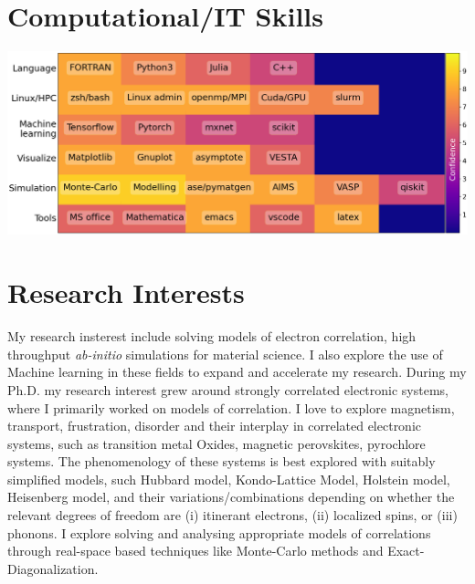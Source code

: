 \documentclass[10pt,a4paper,sans]{moderncv}        %
\begin{document}
\vspace{0.5cm}
\section{Computational/IT Skills}
\includegraphics[width=\textwidth]{skills.png}

\vspace{0.9cm}

\section{Research Interests}
My research insterest include solving models of electron correlation, high throughput \textit{ab-initio} simulations
for material science. I also explore the use of Machine learning in these fields to expand and accelerate my research.
\vspace{0.5cm}
{
  During my Ph.D. my research interest grew around strongly correlated electronic
  systems, where I primarily worked on models of correlation. I love to explore magnetism,
  transport, frustration, disorder and their interplay in correlated electronic systems,
  such as transition metal Oxides, magnetic perovskites, pyrochlore systems.
  The phenomenology of these systems is best explored with suitably simplified models,
  such Hubbard model, Kondo-Lattice Model, Holstein model, Heisenberg model, and their
  variations/combinations depending on whether the relevant degrees of freedom are
  (i) itinerant electrons, (ii) localized spins, or (iii) phonons.
  I explore solving and analysing appropriate models of correlations through real-space
  based techniques like Monte-Carlo methods and Exact-Diagonalization.
}
\vspace{0.5cm}
\end{document}

